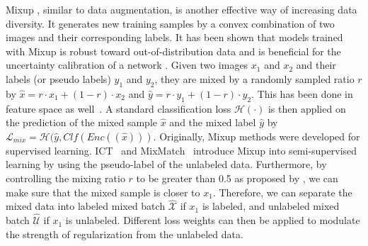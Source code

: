 \documentclass[runningheads]{llncs}
\begin{document}
Mixup \cite{zhang2018mixup,yun2019cutmix,yun2019cutmix,hendrycks2020augmix}, similar to data augmentation, is another effective way of increasing data diversity.
It generates new training samples by a convex combination of two images and their corresponding labels.
It has been shown that models trained with Mixup is robust toward out-of-distribution data \cite{guo2019mixup} and is beneficial for the uncertainty calibration of a network \cite{thulasidasan2019mixup}.
Given two images $x_1$ and $x_2$ and their labels (or pseudo labels)  $y_1$ and $y_2$, they are mixed by a randomly sampled ratio $r$ by $\hat{x} = r \cdot x_1 + (1-r) \cdot x_2$ and $\hat{y} = r \cdot y_1 + (1-r) \cdot y_2$. This has been done in feature space as well~\cite{verma2018manifold}.
A standard classification loss $\mathcal{H}(\cdot)$ is then applied on the prediction of the mixed sample $\hat{x}$ and the mixed label $\hat{y}$ by $\mathcal{L}_{mix} = \mathcal{H}(\hat{y}, Clf(Enc((\hat{x})))$.
Originally, Mixup methods were developed for supervised learning.
ICT~\cite{verma2019interpolation} and MixMatch~\cite{berthelot2019mixmatch} introduce Mixup into semi-supervised learning by using the pseudo-label of the unlabeled data.
Furthermore, by controlling the mixing ratio $r$ to be greater than 0.5 as proposed by \cite{berthelot2019mixmatch}, we can make sure that the mixed sample is closer to $x_1$.
Therefore, we can separate the mixed data into labeled mixed batch $\hat{\mathcal{X}}$ if $x_1$ is labeled, and unlabeled mixed batch $\hat{\mathcal{U}}$ if $x_1$ is unlabeled.
Different loss weights can then be applied to modulate the strength of regularization from the unlabeled data.
\end{document}
